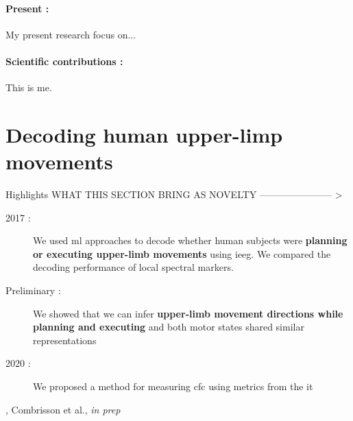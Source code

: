 \documentclass[a4paper,11pt]{article}
\begin{document}
\begin{multicols}{2}
\paragraph{Present :} My present research focus on...

\paragraph{Scientific contributions :}

This is me.

\end{multicols}





\section{Decoding human upper-limp movements}

\begin{highlights}{Highlights}
    WHAT THIS SECTION BRING AS NOVELTY ----------------------- >
    \begin{description}
        \item[2017 :] We used \ac{ml} approaches to decode whether human subjects were \textbf{planning or executing upper-limb movements} using \ac{ieeg}. We compared the decoding performance of local spectral markers.
        \item[Preliminary :] We showed that we can infer \textbf{upper-limb movement directions while planning and executing} and both motor states shared similar representations
        \item[2020 :] We proposed a method for measuring \ac{cfc} using metrics from the \ac{it}
    \end{description}
\tcblower
\cite{combrisson2017intentions,combrisson2020tensorpac}, Combrisson et al., \textit{in prep}
\end{highlights}
\end{document}
